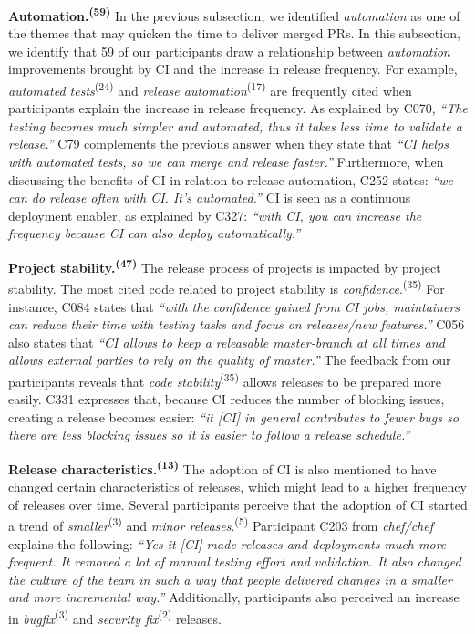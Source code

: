 \vspace{1mm}
\noindent\textbf{Automation.\textsuperscript{(59)}} In the previous subsection, we identified {\em automation} as one of the themes that may quicken the time to deliver merged PRs. In this subsection, we identify that 59 of our participants draw a relationship between {\em automation} improvements brought by CI and the increase in release frequency. For example, \textit{automated tests}\textsuperscript{(24)} and \textit{release automation}\textsuperscript{(17)} are frequently cited when participants explain the increase in release frequency. As explained by C070, \textit{``The testing becomes much simpler and automated, thus it takes less time to validate a release.''} C79 complements the previous answer when they state that \textit{``CI helps with automated tests, so we can merge and release faster.''} Furthermore, when discussing the benefits of CI in relation to release automation, C252 states: \textit{``we can do release often with CI. It's automated.''} 
CI is seen as a continuous deployment enabler, as explained by C327: \textit{``with CI, you can increase the frequency because CI can also deploy automatically.''} 

\vspace{1mm}
\noindent\textbf{Project stability.\textsuperscript{(47)}} The release process of projects is impacted by project stability. The most cited code related to project stability is \textit{confidence}.\textsuperscript{(35)} For instance, C084 states that \textit{``with the confidence gained from CI jobs, maintainers can reduce their time with testing tasks and focus on releases/new features.''}  C056 also states that \textit{``CI allows to keep a releasable master-branch at all times and allows external parties to rely on the quality of master.''} The feedback from our participants reveals that \textit{code stability}\textsuperscript{(35)} allows releases to be prepared more easily. 
C331 expresses that, because CI reduces the number of blocking issues, creating a release becomes easier: \textit{``it [CI] in general contributes to fewer bugs so there are less blocking issues so it is easier to follow a release schedule.''}

\vspace{1mm}
\noindent\textbf{Release characteristics.\textsuperscript{(13)}} The adoption of CI is also mentioned to have changed certain characteristics of releases, which might lead to a higher frequency of releases over time. Several participants perceive that the adoption of CI started a trend of \textit{smaller}\textsuperscript{(3)} and \textit{minor releases}.\textsuperscript{(5)} Participant C203 from \textit{chef/chef} explains the following: \textit{``Yes it [CI] made releases and deployments much more frequent. It removed a lot of manual testing effort and validation. It also changed the culture of the team in such a way that people delivered changes in a smaller and more incremental way.''} Additionally,  participants also perceived an increase in \textit{bugfix}\textsuperscript{(3)} and \textit{security fix}\textsuperscript{(2)} releases. 


